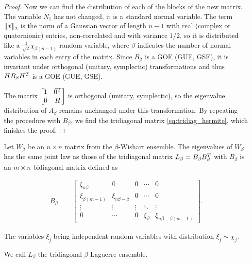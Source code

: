 \begin{proof}
    Now we can find the distribution of each of the blocks of the new matrix. The variable $N_1$ has not changed, it is a standard normal variable. The term $\left\lVert\vec x\right\rVert_2$ is the norm of a Gaussian vector of length $n-1$ with real (complex or quaternionic) entries, non-correlated and with variance $1/2$, so it is distributed like a $\frac1{\sqrt{2}}\chi_{\beta(n-1)}$ random variable, where $\beta$ indicates the number of normal variables in each entry of the matrix. Since $B_\beta$ is a GOE (GUE, GSE), it is invariant under orthogonal (unitary, symplectic) transformations and thus $H B_{\beta} H^T$ is a GOE (GUE, GSE).

    The matrix $ \begin{bmatrix}
        1 & \vec0^T \\ 
        \vec0 & H
    \end{bmatrix}$ is orthogonal (unitary, symplectic), so the eigenvalue distribution of $A_\beta$ remains unchanged under this transformation. By repeating the procedure with $B_\beta$, we find the tridiagonal matrix \eqref{eq:tridiag_hermite}, which finishes the proof.
\end{proof}


\begin{lemma}
    Let $W_\beta$ be an $n\times n$ matrix from the  $\beta$-Wishart ensemble. The eigenvalues of $W_\beta$ has the same joint law as those of the tridiagonal matrix $L_\beta = B_\beta B^T_\beta$ with $B_\beta$ is an $m\times n$ bidiagonal matrix defined as 

    \begin{align} \label{eq:tridiag_laguerre}
        B_\beta &= \begin{bmatrix}
            \xi_{n\beta}   & 0 & 0     & \cdots & 0 \\ 
            \xi_{\beta(m-1)} & \xi_{n\beta - \beta}   & 0 & \cdots & 0 \\
            \vdots & \vdots & \vdots & \ddots & \vdots \\ 
            0      & \cdots & 0      & \xi_{\beta} & \xi_{n\beta - \beta(m-1)} 
        \end{bmatrix}.
    \end{align}

    The variables $\xi_j$ being independent random variables with distribution $\xi_j \sim \chi_j$.

    We call $L_\beta$ the tridiagonal $\beta$-Laguerre ensemble.
\end{lemma}

